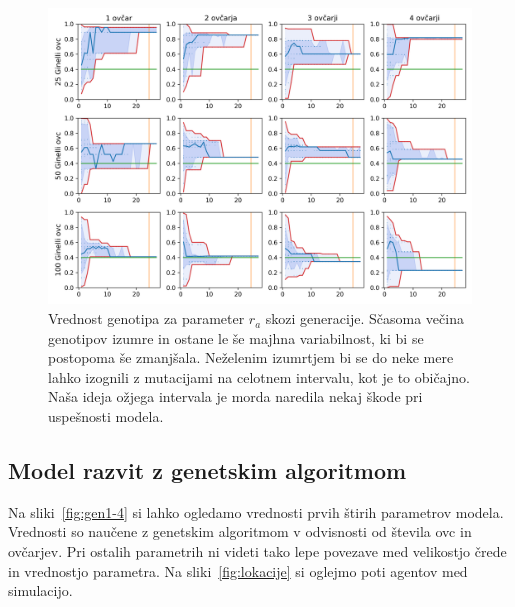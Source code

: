 \begin{figure}[H]  %
\centering
\includegraphics[height=0.4\textheight]{../poglavja/grafi/Ginelli-evolucija-Gen2.png}
\caption[Vrednost genotipa za parameter $r_a$ skozi generacije]{Vrednost genotipa za parameter $r_a$ skozi generacije. Sčasoma večina genotipov izumre in ostane le še majhna variabilnost, ki bi se postopoma še zmanjšala. Neželenim izumrtjem bi se do neke mere lahko izognili z mutacijami na celotnem intervalu, kot je to običajno. Naša ideja ožjega intervala je morda naredila nekaj škode pri uspešnosti modela.} %
\label{fig:Ge-gen2}
\end{figure}

\subsection{Model razvit z genetskim algoritmom}

Na sliki~\ref{fig:gen1-4} si lahko ogledamo vrednosti prvih štirih parametrov modela. Vrednosti so naučene z genetskim algoritmom v odvisnosti od števila ovc in ovčarjev. Pri ostalih parametrih ni videti tako lepe povezave med velikostjo črede in vrednostjo parametra. Na sliki~\ref{fig:lokacije} si oglejmo poti agentov med simulacijo.

